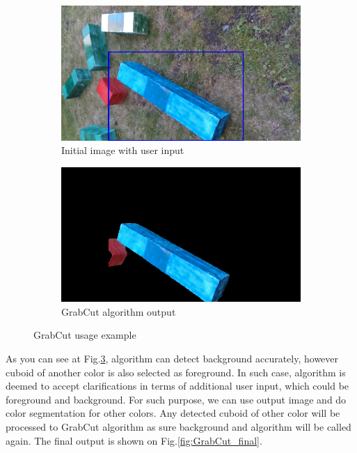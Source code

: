 \documentclass{ctuthesis}
\begin{document}
\begin{figure}[htbp]
     \centering
     \begin{subfigure}{0.475\textwidth}
         \centering
         \includegraphics[width=\textwidth]{GrabCut_init.png}
         \caption{Initial image with user input}
         \label{fig: gc-ex a}
     \end{subfigure}
     \hfill
     \begin{subfigure}{0.475\textwidth}
         \centering
         \includegraphics[width=\textwidth]{GrabCut_result.png}
         \caption{GrabCut algorithm output}
         \label{fig gc-ex b}
     \end{subfigure}

        \caption{GrabCut usage example}
        \label{fig: gc-ex}
\end{figure}

As you can see at Fig.\ref{fig: gc-ex}, algorithm can detect background accurately, however cuboid of another color is also selected as foreground. In such case, algorithm is deemed to accept clarifications in terms of additional user input, which could be foreground and background. For such purpose, we can use output image and do color segmentation for other colors. Any detected cuboid of other color will be processed to GrabCut algorithm as sure background and algorithm will be called again. The final output is shown on Fig.\ref{fig:GrabCut_final}.
\end{document}

